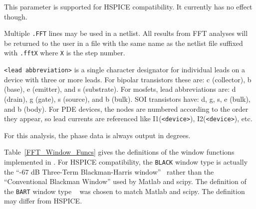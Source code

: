 \begin{Command}
\begin {Arguments}
This parameter is supported for HSPICE compatibility. It currently
has no effect though.

\end{Arguments}

\comments
Multiple \texttt{.FFT} lines may be used in a netlist.  All results from FFT analyses
will be returned to the user in a file with the same name as the netlist file suffixed
with \texttt{.fftX} where {\tt X} is the step number.

\texttt{<lead abbreviation>} is a single character designator for individual
leads on a device with three or more leads.  For bipolar transistors these are:
c (collector), b (base), e (emitter), and s (substrate).  For mosfets, lead
abbreviations are: d (drain), g (gate), s (source), and b (bulk).  SOI
transistors have: d, g, s, e (bulk), and b (body).  For PDE devices, the nodes
are numbered according to the order they appear, so lead currents are
referenced like I1(\texttt{<device>}), I2(\texttt{<device>}), etc.

For this analysis, the phase data is always output in degrees.

\end{Command}

Table~\ref{FFT_Window_Funcs} gives the definitions of the window functions
implemented in \Xyce{}.  For HSPICE compatibility, the {\tt BLACK} window type
is actually the ``-67 dB Three-Term Blackman-Harris window''~\cite{Doerry2017}
rather than the ``Conventional Blackman Window'' used by Matlab and scipy.
The definition of the {\tt BART} window type ~\cite{oppenheimSchafer} was chosen
to match Matlab and scipy.  The \Xyce{} definition may differ from HSPICE.

